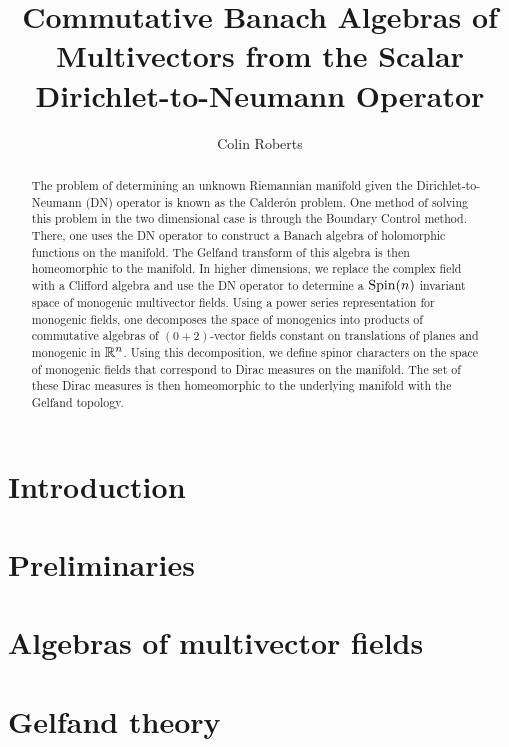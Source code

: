 \documentclass[12pt]{article}
\title{Commutative Banach Algebras of Multivectors from the Scalar Dirichlet-to-Neumann Operator}
\author{Colin Roberts}
\begin{document}
 \begin{titlingpage}
     \maketitle
     \vfill
     \begin{abstract}
        The problem of determining an unknown Riemannian manifold given the Dirichlet-to-Neumann (DN) operator is known as the Calder\'on problem.  One method of solving this problem in the two dimensional case is through the Boundary Control method.  There, one uses the DN operator to construct a Banach algebra of holomorphic functions on the manifold. The Gelfand transform of this algebra is then homeomorphic to the manifold. In higher dimensions, we replace the complex field with a Clifford algebra and use the DN operator to determine a $\operatorname{Spin}(n)$ invariant space of monogenic multivector fields. Using a power series representation for monogenic fields, one decomposes the space of monogenics into products of commutative algebras of $(0+2)$-vector fields constant on translations of planes and monogenic in $\mathbb{R}^n$. Using this decomposition, we define spinor characters on the space of monogenic fields that correspond to Dirac measures on the manifold.  The set of these Dirac measures is then homeomorphic to the underlying manifold with the Gelfand topology.
     \end{abstract}
 \end{titlingpage}



\section{Introduction}


\section{Preliminaries}


\section{Algebras of multivector fields}


\section{Gelfand theory}

\end{document}
